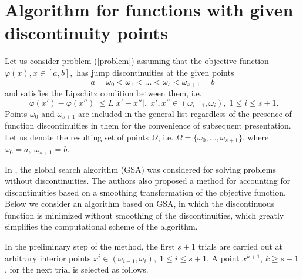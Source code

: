 \documentclass[runningheads]{llncs}
\begin{document}
\section{Algorithm for functions with given discontinuity points}

Let us consider problem (\ref{problem}) assuming that the objective function $\varphi(x), x\in[a,b],$ has jump discontinuities at the given points
\begin{equation}\label{points}
a = \omega_0 <\omega_1 < ... <\omega_s < \omega_{s+1} = b
\end{equation}
and satisfies the Lipschitz condition between them, i.e.
\begin{equation}\label{LipschitzСondition}
\left|\varphi(x')-\varphi(x'')\right|\leq L\left|x'-x''\right|, \; x',x'' \in (\omega_{i-1},\omega_{i}), \; 1 \leq i \leq s+1.
\end{equation}
Points $\omega_{0}$ and $\omega_{s+1}$ are included in the general list regardless of the presence of function discontinuities in them for the convenience of subsequent presentation. Let us denote the resulting set of points $\Omega$, i.e. $\Omega = \{\omega_{0}, ..., \omega_{s+1}\}$, where $\omega_{0} = a, \; \omega_{s+1} = b$.

In \cite{Strongin2000}, the global search algorithm (GSA) was considered for solving problems without discontinuities. The authors also proposed a method for accounting for discontinuities based on a smoothing transformation of the objective function. Below we consider an algorithm based on GSA, in which the discontinuous function is minimized without smoothing of the discontinuities, which greatly simplifies the computational scheme of the algorithm.

In the preliminary step of the method, the first $s+1$ trials are carried out at arbitrary interior points $x^i \in (\omega_{i-1},\omega_{i}), \; 1 \leq i \leq s+1 $. A point $x^{k+1}$, $k \geq s+1$, for the next trial is selected as follows.
\end{document}
